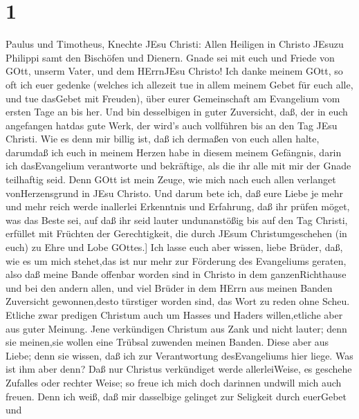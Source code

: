 \hypertarget{section}{%
\section{1}\label{section}}

 Paulus und Timotheus, Knechte JEsu Christi: Allen Heiligen
in Christo JEsuzu Philippi samt den Bischöfen und Dienern. 
Gnade sei mit euch und Friede von GOtt, unserm Vater, und dem HErrnJEsu
Christo!  Ich danke meinem GOtt, so oft ich euer gedenke
 (welches ich allezeit tue in allem meinem Gebet für euch
alle, und tue dasGebet mit Freuden),  über eurer
Gemeinschaft am Evangelium vom ersten Tage an bis her.  Und
bin desselbigen in guter Zuversicht, daß, der in euch angefangen hatdas
gute Werk, der wird's auch vollführen bis an den Tag JEsu Christi.
 Wie es denn mir billig ist, daß ich dermaßen von euch allen
halte, darumdaß ich euch in meinem Herzen habe in diesem meinem
Gefängnis, darin ich dasEvangelium verantworte und bekräftige, als die
ihr alle mit mir der Gnade teilhaftig seid.  Denn GOtt ist
mein Zeuge, wie mich nach euch allen verlanget vonHerzensgrund in JEsu
Christo.  Und darum bete ich, daß eure Liebe je mehr und
mehr reich werde inallerlei Erkenntnis und Erfahrung,  daß
ihr prüfen möget, was das Beste sei, auf daß ihr seid lauter
undunanstößig bis auf den Tag Christi,  erfüllet mit
Früchten der Gerechtigkeit, die durch JEsum Christumgeschehen (in euch)
zu Ehre und Lobe GOttes.{]}  Ich lasse euch aber wissen,
liebe Brüder, daß, wie es um mich stehet,das ist nur mehr zur Förderung
des Evangeliums geraten,  also daß meine Bande offenbar
worden sind in Christo in dem ganzenRichthause und bei den andern allen,
 und viel Brüder in dem HErrn aus meinen Banden Zuversicht
gewonnen,desto türstiger worden sind, das Wort zu reden ohne Scheu.
 Etliche zwar predigen Christum auch um Hasses und Haders
willen,etliche aber aus guter Meinung.  Jene verkündigen
Christum aus Zank und nicht lauter; denn sie meinen,sie wollen eine
Trübsal zuwenden meinen Banden.  Diese aber aus Liebe; denn
sie wissen, daß ich zur Verantwortung desEvangeliums hier liege.
 Was ist ihm aber denn? Daß nur Christus verkündiget werde
allerleiWeise, es geschehe Zufalles oder rechter Weise; so freue ich
mich doch darinnen undwill mich auch freuen.  Denn ich
weiß, daß mir dasselbige gelinget zur Seligkeit durch euerGebet und
